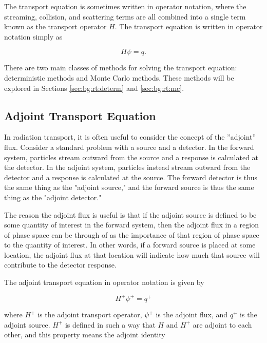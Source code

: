 The transport equation is sometimes written in operator notation, where the streaming, collision, and scattering terms are all combined into a single term known as the transport operator $H$.
The transport equation is written in operator notation simply as

\begin{equation}\label{eq:bg:rt:transport-operator}
  H\psi = q.
\end{equation}

There are two main classes of methods for solving the transport equation: deterministic methods and Monte Carlo methods.
These methods will be explored in Sections \ref{sec:bg:rt:determ} and \ref{sec:bg:rt:mc}.

\subsection{Adjoint Transport Equation}
\label{sec:bg:rt:adjoint}

In radiation transport, it is often useful to consider the concept of the ''adjoint'' flux.
Consider a standard problem with a source and a detector.
In the forward system, particles stream outward from the source and a response is calculated at the detector.
In the adjoint system, particles instead stream outward from the detector and a response is calculated at the source.
The forward detector is thus the same thing as the "adjoint source," and the forward source is thus the same thing as the "adjoint detector."

The reason the adjoint flux is useful is that if the adjoint source is defined to be some quantity of interest in the forward system, then the adjoint flux in a region of phase space can be through of as the importance of that region of phase space to the quantity of interest.
In other words, if a forward source is placed at some location, the adjoint flux at that location will indicate how much that source will contribute to the detector response.

The adjoint transport equation in operator notation is given by

\begin{equation}\label{eq:bg:rt:adjoint-transport-operator}
  H^+\psi^+ = q^+
\end{equation}

where $H^+$ is the adjoint transport operator, $\psi^+$ is the adjoint flux, and $q^+$ is the adjoint source.
$H^+$ is defined in such a way that $H$ and $H^+$ are adjoint to each other, and this property means the adjoint identity

